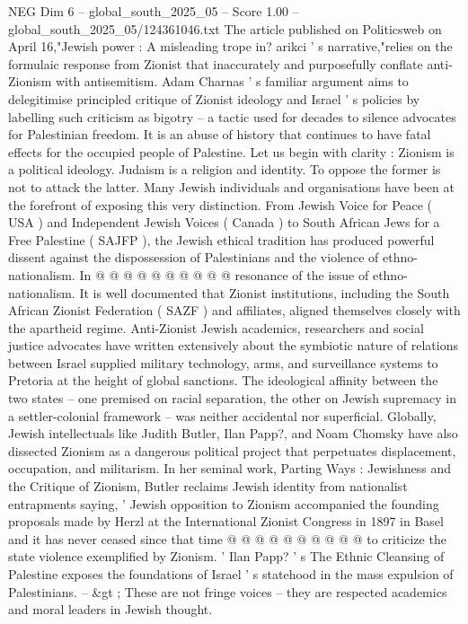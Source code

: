 \begin{textsample}{NEG Dim 6 – global\_south\_2025\_05 – Score 1.00 – global\_south\_2025\_05/124361046.txt}  \label{ex:f6_neg_426}
The article published on Politicsweb on April 16,"Jewish power : A misleading trope in? arikci ' s narrative,"relies on the formulaic response from Zionist that inaccurately and purposefully conflate anti-Zionism with antisemitism.
Adam Charnas ' s familiar argument aims to delegitimise principled critique of Zionist ideology and Israel ' s policies by labelling such criticism as bigotry -- a tactic used for decades to silence advocates for Palestinian freedom.
It is an abuse of history that continues to have fatal effects for the occupied people of Palestine.
Let us begin with clarity : Zionism is a political ideology.
Judaism is a religion and identity.
To oppose the former is not to attack the latter.
Many Jewish individuals and organisations have been at the forefront of exposing this very distinction.
From Jewish Voice for Peace ( USA ) and Independent Jewish Voices ( Canada ) to South African Jews for a Free Palestine ( SAJFP ), the Jewish ethical tradition has produced powerful dissent against the dispossession of Palestinians and the violence of ethno-nationalism.
In @ @ @ @ @ @ @ @ @ @ resonance of the issue of ethno-nationalism.
It is well documented that Zionist institutions, including the South African Zionist Federation ( SAZF ) and affiliates, aligned themselves closely with the apartheid regime.
Anti-Zionist Jewish academics, researchers and social justice advocates have written extensively about the symbiotic nature of relations between Israel supplied military technology, arms, and surveillance systems to Pretoria at the height of global sanctions.
The ideological affinity between the two states -- one premised on racial separation, the other on Jewish supremacy in a settler-colonial framework -- was neither accidental nor superficial.
Globally, Jewish intellectuals like Judith Butler, Ilan Papp?, and Noam Chomsky have also dissected Zionism as a dangerous political project that perpetuates displacement, occupation, and militarism.
In her seminal work, Parting Ways : Jewishness and the Critique of Zionism, Butler reclaims Jewish identity from nationalist entrapments saying, ' Jewish opposition to Zionism accompanied the founding proposals made by Herzl at the International Zionist Congress in 1897 in Basel and it has never ceased since that time @ @ @ @ @ @ @ @ @ @ to criticize the state violence exemplified by Zionism. ' Ilan Papp? ' s The Ethnic Cleansing of Palestine exposes the foundations of Israel ' s statehood in the mass expulsion of Palestinians. -- \&gt ; These are not fringe voices -- they are respected academics and moral leaders in Jewish thought.

\end{textsample}
